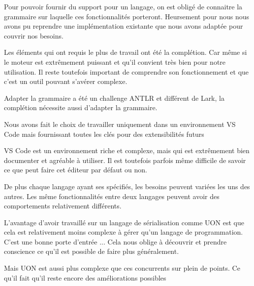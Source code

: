 \documentclass[
    iict, %
    il, %
]{heig-tb}
\begin{document}







Pour pouvoir fournir du support pour un langage, on est obligé de connaitre la grammaire sur laquelle ces fonctionnalités porteront.
Heursement pour nous nous avons pu reprendre une implémentation existante que nous avons adaptée pour couvrir nos besoins.

Les éléments qui ont requis le plus de travail ont été la complétion.
Car même si le moteur est extrêmement puissant et qu'il convient très bien pour notre utilisation. Il reste toutefois important de comprendre son fonctionnement et que c'est un outil pouvant s'avérer complexe.

Adapter la grammaire a été un challenge ANTLR et différent de Lark, la complétion nécessite aussi d'adapter la grammaire.


Nous avons fait le choix de travailler uniquement dans un environnement VS Code mais fournissant toutes les clés pour des extensibilités futurs

VS Code est un environnement riche et complexe, mais qui est extrêmement bien documenter et agréable à utiliser.
Il est toutefois parfois même difficile de savoir ce que peut faire cet éditeur par défaut ou non.

De plus chaque langage ayant ses spécifiés, les besoins peuvent variées les uns des autres.
Les même fonctionnalités entre deux langages peuvent avoir des comportements relativement différents.

L'avantage d'avoir travaillé sur un langage de sérialisation comme UON est que cela est relativement moins complexe à gérer qu'un langage de programmation.
C'est une bonne porte d'entrée ...
Cela nous oblige à découvrir et prendre conscience ce qu'il est possible de faire plus généralement.

Mais UON est aussi plus complexe que ces concurrents sur plein de points.
Ce qu'il fait qu'il reste encore des améliorations possibles
\end{document}
